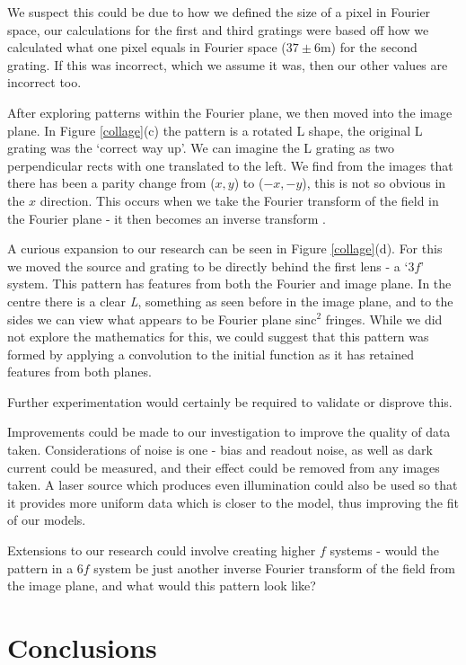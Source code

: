 \documentclass[twocolumn]{revtex4}
\begin{document}
We suspect this could be due to how we defined the size of a pixel in Fourier space, our calculations for the first and third gratings were based off how we calculated what one pixel equals in Fourier space ($37\pm6$m) for the second grating. If this was incorrect, which we assume it was, then our other values are incorrect too.

After exploring patterns within the Fourier plane, we then moved into the image plane. In Figure \ref{collage}(c) the pattern is a rotated L shape, the original L grating was the `correct way up'. We can imagine the L grating as two perpendicular rects with one translated to the left. We find from the images that there has been a parity change from ($x,y$) to ($-x,-y$), this is not so obvious in the $x$ direction. This occurs when we take the Fourier transform of the field in the Fourier plane - it then becomes an inverse transform \cite{of2f}. 

A curious expansion to our research can be seen in Figure \ref{collage}(d). For this we moved the source and grating to be directly behind the first lens - a `$3f$' system. This pattern has features from both the Fourier and image plane. In the centre there is a clear \textit{L}, something as seen before in the image plane, and to the sides we can view what appears to be Fourier plane sinc$^2$ fringes. While we did not explore the mathematics for this, we could suggest that this pattern was formed by applying a convolution to the initial function as it has retained features from both planes.

Further experimentation would certainly be required to validate or disprove this.

Improvements could be made to our investigation to improve the quality of data taken. Considerations of noise is one - bias and readout noise, as well as dark current could be measured, and their effect could be removed from any images taken. A laser source which produces even illumination could also be used so that it provides more uniform data which is closer to the model, thus improving the fit of our models.

Extensions to our research could involve creating higher $f$ systems - would the pattern in a $6f$ system be just another inverse Fourier transform of the field from the image plane, and what would this pattern look like?

\vspace{-5ex}
\section{Conclusions}
\vspace{-2ex}
\end{document}
